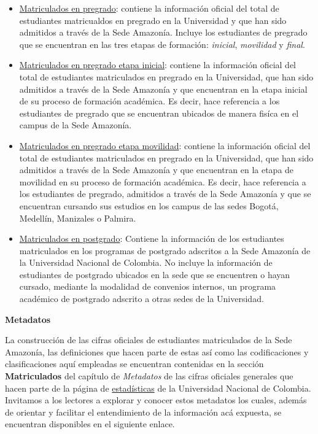 \documentclass[
]{book}
\begin{document}
\begin{itemize}
\item
  \protect\hyperlink{MatPre}{Matriculados en pregrado}: contiene la información oficial del total de estudiantes matricualdos en pregrado en la Universidad y que han sido admitidos a través de la Sede Amazonía. Incluye los estudiantes de pregrado que se encuentran en las tres etapas de formación: \emph{inicial}, \emph{movilidad} y \emph{final}.
\item
  \protect\hyperlink{MatPreIni}{Matriculados en pregrado etapa inicial}: contiene la información oficial del total de estudiantes matriculados en pregrado en la Universidad, que han sido admitidos a través de la Sede Amazonía y que encuentran en la etapa inicial de su proceso de formación académica. Es decir, hace referencia a los estudiantes de pregrado que se encuentran ubicados de manera fisíca en el campus de la Sede Amazonía.
\item
  \protect\hyperlink{MatPreMov}{Matriculados en pregrado etapa movilidad}: contiene la información oficial del total de estudiantes matriculados en pregrado en la Universidad, que han sido admitidos a través de la Sede Amazonía y que encuentran en la etapa de movilidad en su proceso de formación académica. Es decir, hace referencia a los estudiantes de pregrado, admitidos a través de la Sede Amazonía y que se encuentran cursando sus estudios en los campus de las sedes Bogotá, Medellín, Manizales o Palmira.
\item
  \protect\hyperlink{MatPos}{Matriculados en postgrado}: Contiene la información de los estudiantes matriculados en los programas de postgrado adscritos a la Sede Amazonía de la Universidad Nacional de Colombia. No incluye la información de estudiantes de postgrado ubicados en la sede que se encuentren o hayan cursado, mediante la modalidad de convenios internos, un programa académico de postgrado adscrito a otras sedes de la Universidad.
\end{itemize}

\textbf{Metadatos}

La construcción de las cifras oficiales de estudiantes matriculados de la Sede Amazonía, las definiciones que hacen parte de estas así como las codificaciones y clasificaciones aquí empleadas se encuentran contenidas en la sección \textbf{Matriculados} del capítulo de \emph{Metadatos} de las cifras oficiales generales que hacen parte de la página de \href{http://estadisticas.unal.edu.co/home/}{estadísticas} de la Universidad Nacional de Colombia. Invitamos a los lectores a explorar y conocer estos metadatos los cuales, además de orientar y facilitar el entendimiento de la información acá expuesta, se encuentran disponibles en el siguiente enlace.
\end{document}
